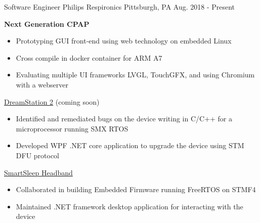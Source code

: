 


\begin{cventries}


\cventry
{Software Engineer} %
{Philips Respironics} %
{Pittsburgh, PA} %
{Aug. 2018 - Present} %
{ %
\begin{cvitems}
\item 
{
    \textbf{Next Generation CPAP} 
    \begin{itemize}
        \item Prototyping GUI front-end using web technology on embedded Linux
        \item Cross compile in docker container for ARM A7
        \item Evaluating multiple UI frameworks LVGL, TouchGFX, and using Chromium with a webserver
    \end{itemize} 
}
\item 
{
    \href{https://www.usa.philips.com/healthcare/product/HCNOCTN447/dreamstation-cpap-bi-level-therapy-systems}{\color{RoyalBlue}DreamStation 2} 
    (coming soon)
    \begin{itemize}
        \item Identified and remediated bugs on the device writing in C/C++ for a microprocessor running SMX RTOS
        \item Developed WPF .NET core application to upgrade the device using STM DFU protocol
    \end{itemize} 
}
\item 
{
    \href{https://www.usa.philips.com/c-e/smartsleep/deep-sleep-headband.html}{\color{RoyalBlue}SmartSleep Headband} 
    \begin{itemize}
        \item Collaborated in building Embedded Firmware running FreeRTOS on STMF4
        \item Maintained .NET framework desktop application for interacting with the device

\end{itemize}}
\end{cvitems}}
\end{cventries}
